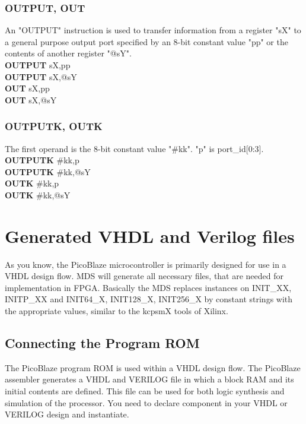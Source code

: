         \subsubsection{OUTPUT, OUT}
            An "OUTPUT" instruction is used to transfer information from a register "sX" to a general purpose output port specified by an 8-bit constant value "pp" or the
            contents of another register "@sY".\\
                \textbf{OUTPUT}     sX,pp\\
                \textbf{OUTPUT}     sX,@sY\\
                \textbf{OUT}        sX,pp\\
                \textbf{OUT}        sX,@sY\\
        \subsubsection{OUTPUTK, OUTK}
            The first operand is the 8-bit constant value "\#kk". "p" is port\_id[0:3].\\
                \textbf{OUTPUTK}     \#kk,p\\
                \textbf{OUTPUTK}     \#kk,@sY\\
                \textbf{OUTK}        \#kk,p\\
                \textbf{OUTK}        \#kk,@sY\\

        \section{Generated VHDL and Verilog files}
            As you know, the PicoBlaze microcontroller is primarily designed for use in a VHDL design flow.
            MDS will generate all necessary files, that are needed for
            implementation in FPGA. Basically the MDS replaces instances on
            {INIT\_XX}, {INITP\_XX} and {INIT64\_X}, {INIT128\_X}, {INIT256\_X} by constant strings with the appropriate values, similar to the kcpsmX tools of Xilinx.

        \subsection{Connecting the Program ROM}
            The PicoBlaze program ROM is used within a VHDL design flow. The PicoBlaze assembler
                    generates a VHDL and VERILOG file in which a block RAM and its initial contents are defined. This
                    file can be used for both logic synthesis and simulation of the processor.
                    You need to declare component in your VHDL or VERILOG design and instantiate.
